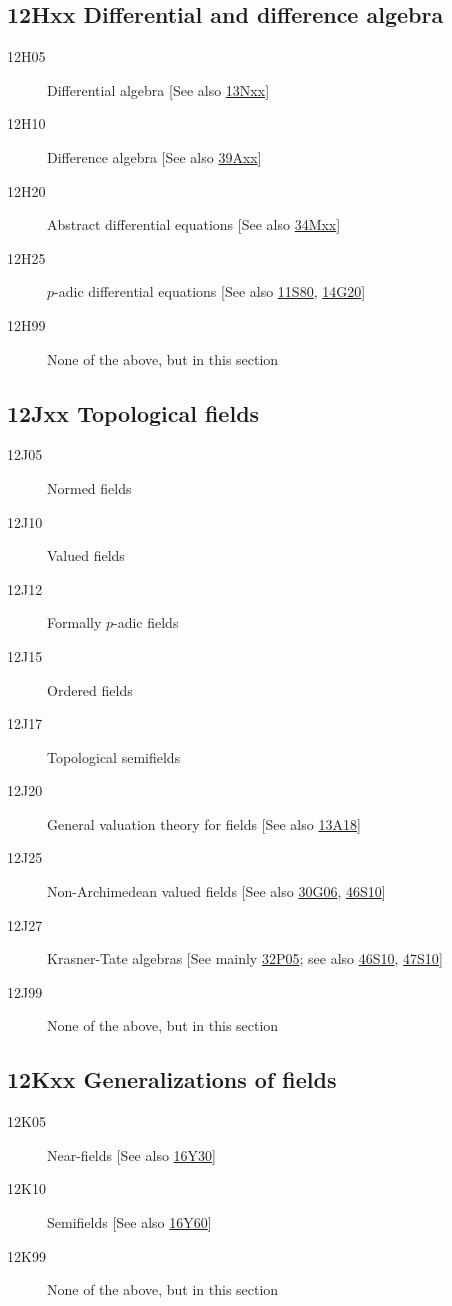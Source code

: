 \documentclass[letterpaper]{article}
\begin{document}
\subsection*{12Hxx  Differential and difference algebra }\label{12Hxx}
\begin{description}  
\item [12H05]\label{12H05} Differential algebra [See also \hyperref[13Nxx]{13Nxx}]
\item [12H10]\label{12H10} Difference algebra [See also \hyperref[39Axx]{39Axx}]
\item [12H20]\label{12H20} Abstract differential equations [See also \hyperref[34Mxx]{34Mxx}]
\item [12H25]\label{12H25} $p$-adic differential equations [See also \hyperref[11S80]{11S80}, \hyperref[14G20]{14G20}]
\item [12H99]\label{12H99} None of the above, but in this section
\end{description}
\subsection*{12Jxx  Topological fields }\label{12Jxx}
\begin{description}  
\item [12J05]\label{12J05} Normed fields
\item [12J10]\label{12J10} Valued fields
\item [12J12]\label{12J12} Formally $p$-adic fields
\item [12J15]\label{12J15} Ordered fields
\item [12J17]\label{12J17} Topological semifields
\item [12J20]\label{12J20} General valuation theory for fields [See also \hyperref[13A18]{13A18}]
\item [12J25]\label{12J25} Non-Archimedean valued fields [See also \hyperref[30G06]{30G06}, \hyperref[46S10]{46S10}]
\item [12J27]\label{12J27} Krasner-Tate algebras [See mainly \hyperref[32P05]{32P05}; see also \hyperref[46S10]{46S10}, \hyperref[47S10]{47S10}]
\item [12J99]\label{12J99} None of the above, but in this section
\end{description}
\subsection*{12Kxx  Generalizations of fields }\label{12Kxx}
\begin{description}  
\item [12K05]\label{12K05} Near-fields [See also \hyperref[16Y30]{16Y30}]
\item [12K10]\label{12K10} Semifields [See also \hyperref[16Y60]{16Y60}]
\item [12K99]\label{12K99} None of the above, but in this section
\end{description}
\end{document}

